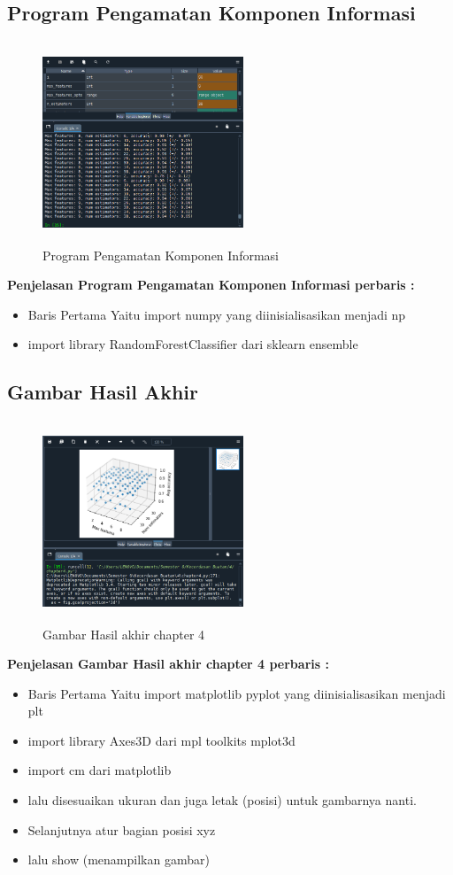 \subsection{Program Pengamatan Komponen Informasi}
\begin{figure}[!htbp]
	\centering
	\includegraphics[width=6cm,height=6cm]{figures/Cp4-8.png}
	\caption{Program Pengamatan Komponen Informasi}
	\label{penanda}
\end{figure}
\textbf{Penjelasan Program Pengamatan Komponen Informasi perbaris :}
\begin{itemize}
	\item Baris Pertama Yaitu import numpy yang diinisialisasikan menjadi np
	\item import library RandomForestClassifier dari sklearn ensemble
\end{itemize}

\subsection{Gambar Hasil Akhir}
\begin{figure}[!htbp]
	\centering
	\includegraphics[width=6cm,height=6cm]{figures/Cp4-9.png}
	\caption{Gambar Hasil akhir chapter 4}
	\label{penanda}
\end{figure}
\textbf{Penjelasan Gambar Hasil akhir chapter 4 perbaris :}
\begin{itemize}
	\item Baris Pertama Yaitu import matplotlib pyplot yang diinisialisasikan menjadi plt
	\item import library Axes3D dari mpl toolkits mplot3d
	\item import cm dari matplotlib
	\item lalu disesuaikan ukuran dan juga letak (posisi) untuk gambarnya nanti. 
	\item Selanjutnya atur bagian posisi xyz
	\item lalu show (menampilkan gambar)
\end{itemize}
